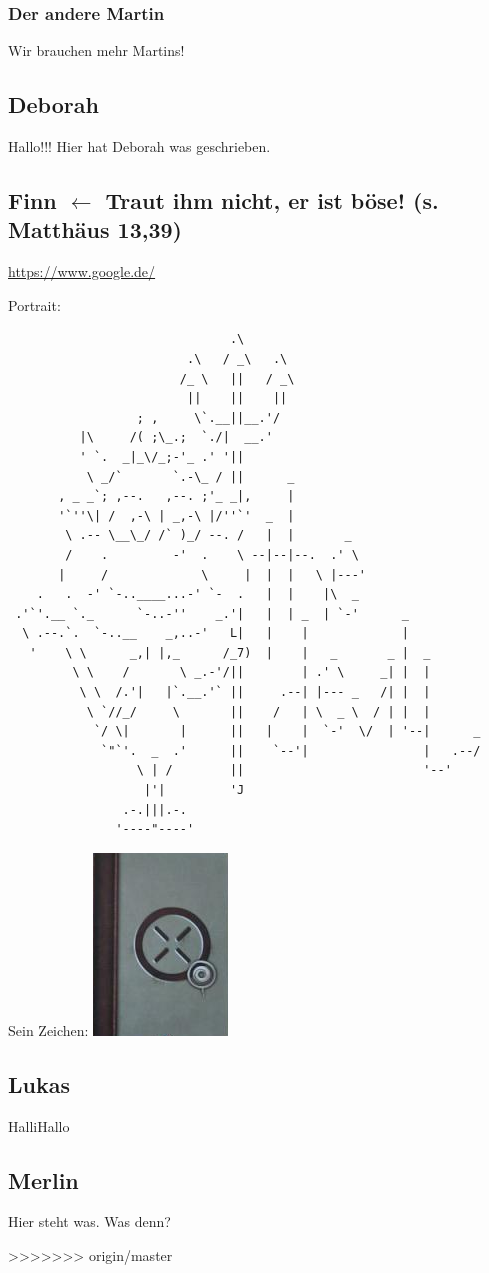 \documentclass[12pt]{scrartcl}
\begin{document}
\subsubsection{Der andere Martin}
Wir brauchen mehr Martins!

\subsection{Deborah}
Hallo!!! Hier hat Deborah was geschrieben.

\newpage
\subsection{Finn $\leftarrow$ Traut ihm nicht, er ist böse! (s. Matthäus 13,39)}
\url{https://www.google.de/}

Portrait:
\begin{verbatim}
                               .\
                         .\   / _\   .\
                        /_ \   ||   / _\
                         ||    ||    ||
                  ; ,     \`.__||__.'/
          |\     /( ;\_.;  `./|  __.'
          ' `.  _|_\/_;-'_ .' '||
           \ _/`       `.-\_ / ||      _
       , _ _`; ,--.   ,--. ;'_ _|,     |
       '`''\| /  ,-\ | _,-\ |/''`'  _  |
        \ .-- \__\_/ /` )_/ --. /   |  |       _
        /    .         -'  .    \ --|--|--.  .' \
       |     /             \     |  |  |   \ |---'
    .   .  -' `-..____...-' `-  .   |  |    |\  _
 .'`'.__ `._      `-..-''    _.'|   |  | _  | `-'      _
  \ .--.`.  `-..__    _,..-'   L|   |    |             |
   '    \ \      _,| |,_      /_7)  |    |   _       _ |  _
         \ \    /       \ _.-'/||        | .' \     _| |  |
          \ \  /.'|   |`.__.'` ||     .--| |--- _   /| |  |
           \ `//_/     \       ||    /   | \  _ \  / | |  |
            `/ \|       |      ||   |    |  `-'  \/  | '--|      _
             `"`'.  _  .'      ||    `--'|                |   .--/
                  \ | /        ||                         '--'
                   |'|         'J
                .-.|||.-.
               '----"----' 
\end{verbatim}

Sein Zeichen: \includegraphics{finnsZeichen.png}
\subsection{Lukas}
HalliHallo


\subsection{Merlin}
Hier steht was.
Was denn?

>>>>>>> origin/master
\end{document}
